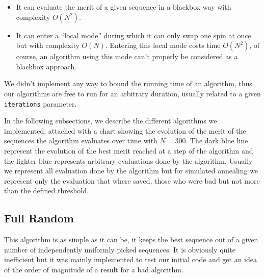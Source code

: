 \documentclass{article}
\begin{document}
  \begin{itemize}
    \item It can evaluate the merit of a given sequence in a blackbox way with
      complexity $O(N^2)$.
    \item It can enter a ``local mode'' during which it can only swap one spin
      at once but with complexity $O(N)$. Entering this local mode costs time
      $O(N^2)$, of course, an algorithm using this mode can't properly be
      considered as a blackbox approach.
  \end{itemize}

  We didn't implement any way to bound the running time of an algorithm, thus
  our algorithms are free to run for an arbitrary duration, usually related to
  a given \texttt{iterations} parameter.

  In the following subsections, we describe the different algorithms we
  implemented, attached with a chart showing the evolution of the merit of the
  sequences the algorithm evaluates over time with $N = 300$. The dark blue
  line represent the evolution of the best merit reached at a step of the
  algorithm and the lighter blue represents arbitrary evaluations done by the
  algorithm. Usually we represent all evaluation done by the algorithm but for
  simulated annealing we represent only the evaluation that where saved, those
  who were bad but not more than the defined threshold.


\subsection{Full Random}

  This algorithm is as simple as it can be, it keeps the best sequence out of a
  given number of independently uniformly picked sequences. It is obviously
  quite inefficient but it was mainly implemented to test our initial code and
  get an idea of the order of magnitude of a result for a bad algorithm.
\end{document}
